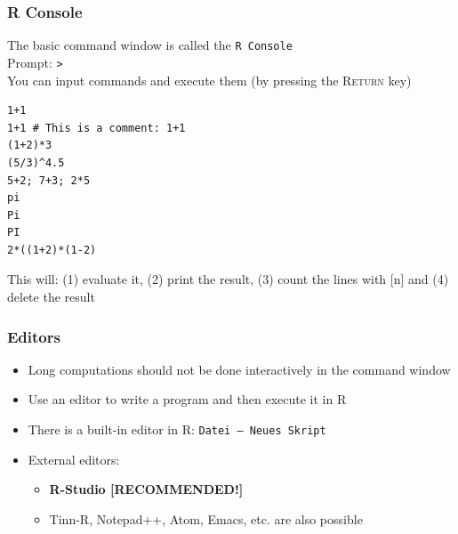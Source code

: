 \documentclass[xcolor={svgnames},10pt,
handout
]{beamer}
\begin{document}
\begin{frame}[fragile]
\frametitle{R Console}\small
The basic command window is called the \texttt{R Console}\\
Prompt: \texttt{>}\\
You can input commands and execute them (by pressing the \textsc{Return} key)
\begin{lstlisting}
1+1
1+1 # This is a comment: 1+1
(1+2)*3
(5/3)^4.5
5+2; 7+3; 2*5
pi
Pi
PI
2*((1+2)*(1-2)
\end{lstlisting}
This will: (1) evaluate it, (2) print the result, (3) count the lines with [n] and (4) delete the result
\end{frame}

\begin{frame}
\frametitle{Editors}
\begin{itemize}
	\item Long computations should not be done interactively in the command	window
	\item Use an editor to write a program and then execute it in R
	\item There is a built-in editor in R: \texttt{Datei -- Neues Skript}
	\item External editors:
	\begin{itemize}
		\item \textbf{R-Studio [RECOMMENDED!]}
		\item Tinn-R, Notepad++, Atom, Emacs, etc. are also possible
	\end{itemize}
\end{itemize}
\end{frame}
\end{document}
